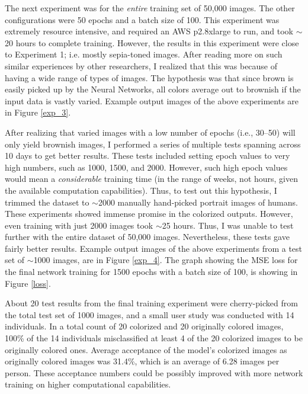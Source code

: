 \documentclass[10pt,twocolumn,letterpaper]{article}
\begin{document}
	The next experiment was for the \textit{entire} training set of 50,000 images. The other configurations were 50 epochs and a batch size of 100. This experiment was extremely resource intensive, and required an AWS p2.8xlarge to run, and took $\sim$20 hours to complete training. However, the results in this experiment were close to Experiment 1; i.e. mostly sepia-toned images. After reading more on such similar experiences by other researchers, I realized that this was because of having a wide range of types of images. The hypothesis was that since brown is easily picked up by the Neural Networks, all colors average out to brownish if the input data is vastly varied. Example output images of the above experiments are in Figure \ref{exp_3}.

	After realizing that varied images with a low number of epochs (i.e., 30--50) will only yield brownish images, I performed a series of multiple tests spanning across 10 days to get better results. These tests included setting epoch values to very high numbers, such as 1000, 1500, and 2000. However, such high epoch values would mean a \textit{considerable} training time (in the range of weeks, not hours, given the available computation capabilities). Thus, to test out this hypothesis, I trimmed the dataset to $\sim$2000 manually hand-picked portrait images of humans. These experiments showed immense promise in the colorized outputs. However, even training with just 2000 images took $\sim$25 hours. Thus, I was unable to test further with the entire dataset of 50,000 images. Nevertheless, these tests gave fairly better results. Example output images of the above experiments from a test set of $\sim$1000 images, are in Figure \ref{exp_4}. The graph showing the MSE loss for the final network training for 1500 epochs with a batch size of 100, is showing in Figure \ref{loss}.

	About 20 test results from the final training experiment were cherry-picked from the total test set of 1000 images, and a small user study was conducted with 14 individuals. In a total count of 20 colorized and 20 originally colored images, 100\% of the 14 individuals misclassified at least 4 of the 20 colorized images to be originally colored ones. Average acceptance of the model's colorized images as originally colored images was 31.4\%, which is an average of 6.28 images per person. These acceptance numbers could be possibly improved with more network training on higher computational capabilities.
\end{document}

